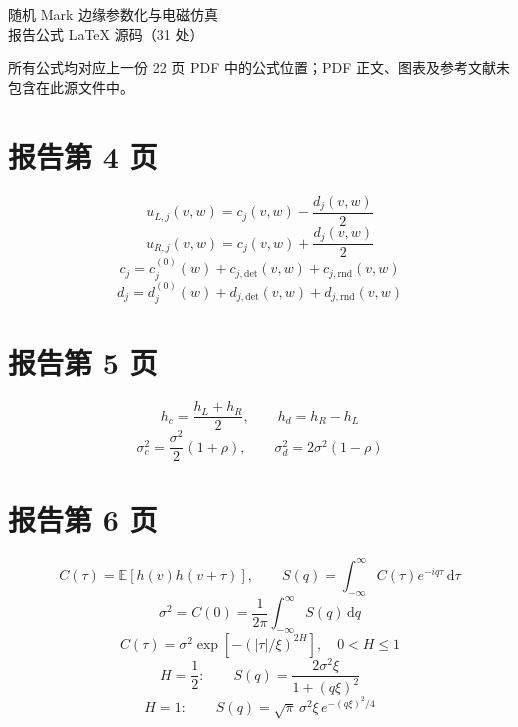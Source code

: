 \documentclass[UTF8,11pt,a4paper]{ctexart}
\begin{document}
\begin{center}
{\LARGE 随机 Mark 边缘参数化与电磁仿真}\\[5pt]
{\large 报告公式 LaTeX 源码（31 处）}
\end{center}
所有公式均对应上一份 22 页 PDF 中的公式位置；PDF 正文、图表及参考文献未包含在此源文件中。

\section*{报告第 4 页}
\begin{equation*}
 u_{L,j}(v,w)=c_j(v,w)-\frac{d_j(v,w)}{2}
\end{equation*}
\begin{equation*}
 u_{R,j}(v,w)=c_j(v,w)+\frac{d_j(v,w)}{2}
\end{equation*}
\begin{equation*}
 c_j=c_j^{(0)}(w)+c_{j,\mathrm{det}}(v,w)+c_{j,\mathrm{rnd}}(v,w)
\end{equation*}
\begin{equation*}
 d_j=d_j^{(0)}(w)+d_{j,\mathrm{det}}(v,w)+d_{j,\mathrm{rnd}}(v,w)
\end{equation*}

\section*{报告第 5 页}
\begin{equation*}
 h_c=\frac{h_L+h_R}{2},\qquad h_d=h_R-h_L
\end{equation*}
\begin{equation*}
 \sigma_c^2=\frac{\sigma^2}{2}(1+\rho),\qquad\sigma_d^2=2\sigma^2(1-\rho)
\end{equation*}

\section*{报告第 6 页}
\begin{equation*}
 C(\tau)=\mathbb{E}\!\left[h(v)h(v+\tau)\right],\qquad S(q)=\int_{-\infty}^{\infty}C(\tau)e^{-iq\tau}\,\mathrm{d}\tau
\end{equation*}
\begin{equation*}
 \sigma^2=C(0)=\frac{1}{2\pi}\int_{-\infty}^{\infty} S(q)\,\mathrm{d}q
\end{equation*}
\begin{equation*}
 C(\tau)=\sigma^2\exp\!\left[-\left(|\tau|/\xi\right)^{2H}\right],\quad 0<H\leq 1
\end{equation*}
\begin{equation*}
 H=\frac12:\qquad S(q)=\frac{2\sigma^2\xi}{1+(q\xi)^2}
\end{equation*}
\begin{equation*}
 H=1:\qquad S(q)=\sqrt{\pi}\,\sigma^2\xi\,e^{-(q\xi)^2/4}
\end{equation*}
\end{document}
